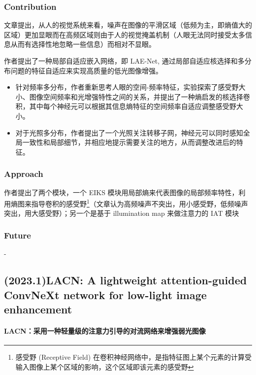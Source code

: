 \documentclass[a4paper, 10pt]{article}
\begin{document}
			\subsubsection{Contribution}
			
			文章提出，从人的视觉系统来看，噪声在图像的平滑区域（低频为主，即熵值大的区域）更加显眼而在高频区域则由于人的视觉掩盖机制（人眼无法同时接受太多信息从而有选择性地忽略一些信息）而相对不显眼。
			
			作者提出了一种局部自适应嵌入网络，即 LAE-Net, 通过局部自适应核选择和多分布问题的特征自适应来实现高质量的低光图像增强。
			
			\begin{itemize}
				\item[(1)] 
				针对频率多分布，作者重新思考人眼的空间-频率特征，实验探索了感受野大小、图像空间频率和光增强特性之间的关系，并提出了一种熵启发的核选择卷积，其中每个神经元可以根据其信息熵特征的空间频率自适应调整感受野大小。
				
				\item[(2)]
				对于光照多分布，作者提出了一个光照关注转移子网，神经元可以同时感知全局一致性和局部细节，并相应地提示需要关注的地方，从而调整改进后的特征。
				
			\end{itemize}	
			
			\subsubsection{Approach}
			
			作者提出了两个模块，一个 EIKS 模块用局部熵来代表图像的局部频率特性，利用熵图来指导卷积的感受野\footnote{感受野 (Receptive Field) 在卷积神经网络中，是指特征图上某个元素的计算受输入图像上某个区域的影响，这个区域即该元素的感受野}（文章认为高频噪声不突出，用小感受野，低频噪声突出，用大感受野）；另一个是基于 illumination map 来做注意力的 IAT 模块
			
			\subsubsection{Future}
		
			-
			
		\subsection{(2023.1)LACN: A lightweight attention-guided ConvNeXt network for low-light image enhancement}
			
		\paragraph{LACN：采用一种轻量级的注意力引导的对流网络来增强弱光图像}
			
\end{document}
